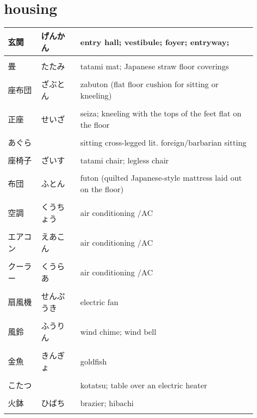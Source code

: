 \documentclass{article}
\newcommand\tabni[1][0.2cm]{\hspace*{#1}}
\begin{document}
\section{ \tabni housing}
\begin{tabular}{ l | l | p{10.5cm} }
玄関        &げんかん   &entry hall; vestibule; foyer; entryway;    \\ \hline \\[-1em]
畳          &たたみ     &tatami mat; Japanese straw floor coverings \\ \hline \\[-1em]
座布団      &ざぶとん   &zabuton (flat floor cushion for sitting or kneeling) \\ \hline \\[-1em]
正座    &せいざ &seiza; kneeling with the tops of the feet flat on the floor\\ \hline \\[-1em]
あぐら      &           &sitting cross-legged {lit. foreign/barbarian sitting} \\ \hline \\[-1em]
座椅子      &ざいす     &tatami chair; legless chair \\ \hline \\[-1em]
布団        &ふとん     &futon (quilted Japanese-style mattress laid out on the floor) \\ \hline \\[-1em]
空調        &くうちょう &air conditioning /AC \\ \hline \\[-1em]
エアコン    &えあこん   &air conditioning /AC \\ \hline \\[-1em]
クーラー    &くうらあ   &air conditioning /AC \\ \hline \\[-1em]
扇風機      &せんぷうき &electric fan \\ \hline \\[-1em]
風鈴        &ふうりん   &wind chime; wind bell \\ \hline \\[-1em]
金魚        &きんぎょ   &goldfish \\ \hline \\[-1em]
こたつ      &           &kotatsu; table over an electric heater \\ \hline \\[-1em]
火鉢        &ひばち     &brazier; hibachi \\ \hline  \\[-1em]

\end{tabular}
\end{document}
